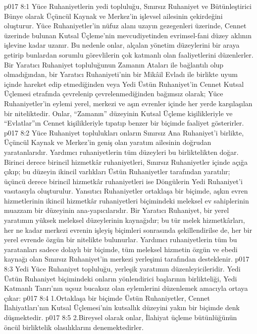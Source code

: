 \vs p017 8:1 Yüce Ruhaniyetlerin yedi topluluğu, Sınırsız Ruhaniyet ve Bütünleştirici Bünye olarak Üçüncül Kaynak ve Merkez’in işlevsel ailesinin çekirdeğini oluşturur. Yüce Ruhaniyetler’in nüfuz alanı uzayın gezegenleri üzerinde, Cennet üzerinde bulunan Kutsal Üçleme’nin mevcudiyetinden evrimsel\hyp{}fani düzey aklının işlevine kadar uzanır. Bu nedenle onlar, alçalan yönetim düzeylerini bir araya getirip bunlardan sorumlu görevlilerin çok katmanlı olan faaliyetlerini düzenlerler. Bir Yaratıcı Ruhaniyet topluluğunun Zamanın Ataları ile bağlantılı olup olmadığından, bir Yaratıcı Ruhaniyeti’nin bir Mikâil Evladı ile birlikte uyum içinde hareket edip etmediğinden veya Yedi Üstün Ruhaniyet’in Cennet Kutsal Üçlemesi etrafında çevrelenip çevrelenmediğinden bağımsız olarak; Yüce Ruhaniyetler’in eylemi yerel, merkezi ve aşın evrenler içinde her yerde karşılaşılan bir niteliktedir. Onlar, “Zamanın” düzeyinin Kutsal Üçleme kişilikleriyle ve “Evlatlar”ın Cennet kişilikleriyle tıpatıp benzer bir biçimde faaliyet gösterirler.
\vs p017 8:2 Yüce Ruhaniyet toplulukları onların Sınırsız Ana Ruhaniyet’i birlikte, Üçüncül Kaynak ve Merkez’in geniş olan yaratım ailesinin doğrudan yaratanlarıdır. Yardımcı ruhaniyetlerin tüm düzeyleri bu birliktelikten doğar. Birinci derece birincil hizmetkâr ruhaniyetleri, Sınırsız Ruhaniyetler içinde açığa çıkıp; bu düzeyin ikincil varlıkları Üstün Ruhaniyetler tarafından yaratılır; üçüncü derece birincil hizmetkâr ruhaniyetleri ise Döngülerin Yedi Ruhaniyet’i vasıtasıyla oluşturulur. Yansıtıcı Ruhaniyetler ortaklaşa bir biçimde, aşkın evren hizmetlerinin ikincil hizmetkâr ruhaniyetleri biçimindeki meleksel ev sahiplerinin muazzam bir düzeyinin ana\hyp{}yapıcılarıdır. Bir Yaratıcı Ruhaniyet, bir yerel yaratımın yüksek meleksel düzeylerinin kaynağıdır; bu tür melek hizmetkârları, her ne kadar merkezi evrenin işleyiş biçimleri sonrasında şekillendirilse de, her bir yerel evrende özgün bir nitelikte bulunurlar. Yardımcı ruhaniyetlerin tüm bu yaratanları sadece dolaylı bir biçimde, tüm meleksel hizmetin özgün ve ebedi kaynağı olan Sınırsız Ruhaniyet’in merkezi yerleşimi tarafından desteklenir.
\vs p017 8:3 Yedi Yüce Ruhaniyet topluluğu, yerleşik yaratımın düzenleyicileridir. Yedi Üstün Ruhaniyet biçimindeki onların yönlendirici başlarının birlikteliği, Yedi Katmanlı Tanrı’nın uçsuz bucaksız olan eylemlerini düzenlemek amacıyla ortaya çıkar:
\vs p017 8:4 1.\bibnobreakspace Ortaklaşa bir biçimde Üstün Ruhaniyetler, Cennet İlahiyatları’nın Kutsal Üçlemesi’nin kutsallık düzeyini yakın bir biçimde denk düşmektedir.
\vs p017 8:5 2.\bibnobreakspace Bireysel olarak onlar, İlahiyat üçleme bütünlüğünün öncül birliktelik olasılıklarını denemektedirler.
